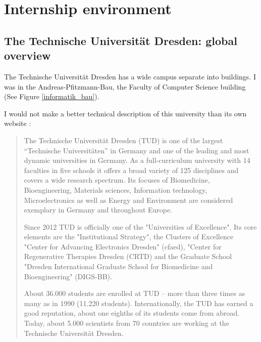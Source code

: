 \documentclass[a4paper,11pt]{report}
\begin{document}
\section{Internship environment}

\subsection{The Technische Universität Dresden: global overview}

The Technische Universität Dresden has a wide campus separate into buildings. I was in the Andreas-Pfitzmann-Bau, the Faculty of Computer Science building (See Figure \ref{informatik_bau}).

I would not make a better technical description of this university than its own website \cite{tud:website}:

\blockquote{The Technische Universität Dresden (TUD) is one of the largest “Technische Universitäten” in Germany and one of the leading and most dynamic universities in Germany. As a full-curriculum university with 14 faculties in five schools it offers a broad variety of 125 disciplines and covers a wide research spectrum. Its focuses of Biomedicine, Bioengineering, Materials sciences, Information technology, Microelectronics as well as Energy and Environment are considered exemplary in Germany and throughout Europe.

Since 2012 TUD is officially one of the "Universities of Excellence". Its core elements are the "Institutional Strategy", the Clusters of Excellence "Center for Advancing Electronics Dresden" (cfaed), "Center for Regenerative Therapies Dresden (CRTD) and the Graduate School "Dresden International Graduate School for Biomedicine and Bioengineering" (DIGS-BB).

About 36.000 students are enrolled at TUD – more than three times as many as in 1990 (11.220 students). Internationally, the TUD has earned a good reputation, about one eighths of its students come from abroad. Today, about 5.000 scientists from 70 countries are working at the Technische Universität Dresden.}
\end{document}
